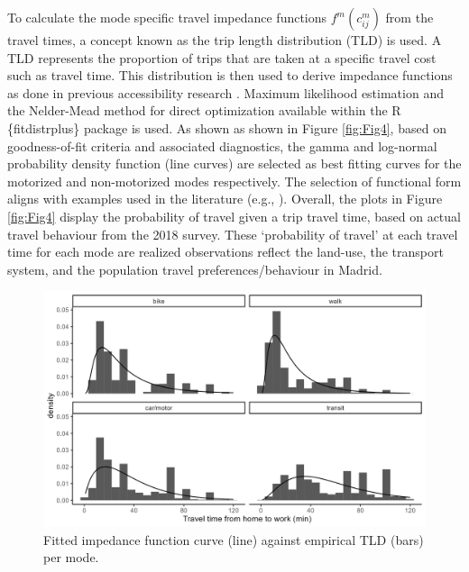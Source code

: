 \documentclass[]{trbunofficial}
\begin{document}
To calculate the mode specific travel impedance functions
\(f^m(c_{ij}^m)\) from the travel times, a concept known as the trip
length distribution (TLD) is used. A TLD represents the proportion of
trips that are taken at a specific travel cost such as travel time. This
distribution is then used to derive impedance functions as done in
previous accessibility research \citep[e.g., works
of][\citet{horbachov_theoretical_2018}, and
\citet{batista_estimation_2019}]{lopez_2017_spatial}. Maximum likelihood
estimation and the Nelder-Mead method for direct optimization available
within the R \{fitdistrplus\} package \citep{fitdistrplus_2015} is used.
As shown as shown in Figure \ref{fig:Fig4}, based on goodness-of-fit
criteria and associated diagnostics, the gamma and log-normal
probability density function (line curves) are selected as best fitting
curves for the motorized and non-motorized modes respectively. The
selection of functional form aligns with examples used in the literature
(e.g., \citet{reggianiAccessibilityImpedanceForms2011}). Overall, the
plots in Figure \ref{fig:Fig4} display the probability of travel given a
trip travel time, based on actual travel behaviour from the 2018 survey.
These `probability of travel' at each travel time for each mode are
realized observations reflect the land-use, the transport system, and
the population travel preferences/behaviour in Madrid.

\begin{figure}

{\centering \includegraphics[width=1\linewidth]{images/tlds_curves_m_plot} 

}

\caption{\label{fig:Fig4} Fitted impedance function curve (line) against empirical TLD (bars) per mode.}\label{fig:tlds-curves-m-plot}
\end{figure}
\end{document}
